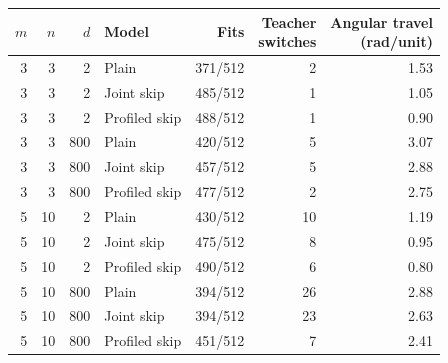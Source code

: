 \begin{tabular}{rrr l r r r}
\toprule
$m$ & $n$ & $d$ & Model & Fits & \shortstack{Teacher\\switches} & \shortstack{Angular travel\\(rad/unit)} \\
\midrule
3 & 3 & 2 & Plain & 371/512 & 2 & 1.53 \\
3 & 3 & 2 & Joint skip & 485/512 & 1 & 1.05 \\
3 & 3 & 2 & Profiled skip & 488/512 & 1 & 0.90 \\
3 & 3 & 800 & Plain & 420/512 & 5 & 3.07 \\
3 & 3 & 800 & Joint skip & 457/512 & 5 & 2.88 \\
3 & 3 & 800 & Profiled skip & 477/512 & 2 & 2.75 \\
5 & 10 & 2 & Plain & 430/512 & 10 & 1.19 \\
5 & 10 & 2 & Joint skip & 475/512 & 8 & 0.95 \\
5 & 10 & 2 & Profiled skip & 490/512 & 6 & 0.80 \\
5 & 10 & 800 & Plain & 394/512 & 26 & 2.88 \\
5 & 10 & 800 & Joint skip & 394/512 & 23 & 2.63 \\
5 & 10 & 800 & Profiled skip & 451/512 & 7 & 2.41 \\
\bottomrule
\end{tabular}
